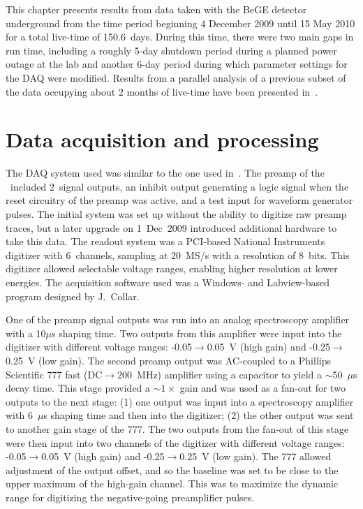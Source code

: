 This chapter presents results from data taken with the BeGE detector underground from the time period beginning 4 December 2009 until 15 May 2010 for a total live-time of 150.6~days.  During this time, there were two main gaps in run time, including a roughly 5-day shutdown period during a planned power outage at the lab and another 6-day period during which parameter settings for the DAQ were modified.  Results from a parallel analysis of a previous subset of the data occupying about 2 months of live-time have been presented in~\cite{Aalseth:2010aa}.

	\section{Data acquisition and processing}
	\label{sec:BeGeDAQProcessing}
	
The DAQ system used was similar to the one used in~\cite{Aalseth:2008aa}.  The preamp of the \bege~included 2~signal outputs, an inhibit output generating a logic signal when the reset circuitry of the preamp was active, and a test input for waveform generator pulses.  The initial system was set up without the ability to digitize raw preamp traces, but a later upgrade on 1~Dec~2009 introduced additional hardware to take this data.  The readout system was a PCI-based National Instruments digitizer with 6~channels, sampling at 20~MS/s with a resolution of 8~bits.  This digitizer allowed selectable voltage ranges, enabling higher resolution at lower energies.  The acquisition software used was a Windows- and Labview-based program designed by J.~Collar.  

One of the preamp signal outputs was run into an analog spectroscopy amplifier with a 10$\mu$s shaping time.  Two outputs from this amplifier were input into the digitizer with different voltage ranges: -0.05$\to$0.05~V (high gain) and -0.25$\to$0.25~V (low gain).  The second preamp output was AC-coupled to a Phillips Scientific 777 fast (DC$\to$200~MHz) amplifier using a capacitor to yield a $\sim$50~$\mu$s decay time.  This stage provided a $\sim1\times$ gain and was used as a fan-out for two outputs to the next stage: (1) one output was input into a spectroscopy amplifier with 6~$\mu$s shaping time and then into the digitizer; (2) the other output was sent to another gain stage of the 777.  The two outputs from the fan-out of this stage were then input into two channels of the digitizer with different voltage ranges: -0.05$\to$0.05~V (high gain) and -0.25$\to$0.25~V (low gain).  The 777 allowed adjustment of the output offset, and so the baseline was set to be close to the upper maximum of the high-gain channel.  This was to maximize the dynamic range for digitizing the negative-going preamplifier pulses.  

